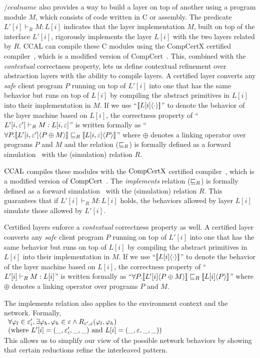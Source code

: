 {$/ccalname$ also provides a way to build a layer on top of another using a program module $M$, which consists of code written in C or assembly.
The predicate $L'[i] \vdash_R  M : L[i]$ indicates that the layer implementation $M$, built on top of the interface $L'[i]$, rigorously implements
the layer $L[i]$ with the two layers related by $R$.
CCAL can compile these C modules using the CompCertX certified compiler~\cite{deepspec},
which is a modified version of CompCert~\cite{compcert}.
This, combined with the {\em contextual} correctness property,
lets us define contextual refinement over abstraction layers with the ability to compile layers.
A certified layer converts any {\em safe} client program $P$ running on top of $L'[i]$ into one that has the
same behavior but runs on top of $L[i]$ by compiling the abstract
primitives in $L[i]$ into their implementation in $M$.
If we use ``$[\![{L[i]} \langle {\cdot} \rangle]\!]$'' to denote the behavior of the layer machine based on
$L[i]$, the correctness property of ``$L'[i, {\varepsilon}'] \vdash_{R} M : L[i, {\varepsilon}]$'' is written
formally as ``$\forall{}P.[\![{L'[i, {\varepsilon}']} \langle {P\oplus{}M} \rangle]\!] \sqsubseteq_R [\![{L[i, {\varepsilon}]} \langle {P} \rangle]\!]$''
where $\oplus$ denotes a linking operator over programs $P$ and $M$ and 
the relation ($\sqsubseteq_R$) is formally defined as a forward
simulation~\cite{Lynch95,leroy09,Milner71,Park81} with the (simulation) relation $R$.

$\mathrm{CCAL}$ compiles these modules with the $\mathrm{CompCertX}$ certified compiler~\cite{deepspec},
which is a modified version of $\mathrm{CompCert}$~\cite{deepspec, compcert}.
The {\em implements} relation ($\sqsubseteq_R$) is formally defined as a forward
simulation~\cite{Lynch95,leroy09,Milner71,Park81} with the (simulation) relation $R$.
This guarantees that if $L'[i] \vdash_R  M : L[i]$ holds,
the behaviors allowed by layer $L[i]$ simulate those allowed by $L'[i]$.

Certified layers enforce a {\em contextual} correctness property as well.
A certified layer converts any {\em safe} client program $P$ running on top of $L'[i]$ into one that has the
same behavior but runs on top of $L[i]$ by compiling the abstract
primitives in $L[i]$ into their implementation in $M$.
If we use ``$[\![{L[i]} \langle {\cdot} \rangle]\!]$'' to denote the behavior of the layer machine based on
$L[i]$, the correctness property of ``$L'[i] \vdash_{R} M : L[i]$'' is written
formally as ``$\forall{}P.[\![{L'[i]} \langle {P\oplus{}M} \rangle]\!] \sqsubseteq_R [\![{L[i]} \langle {P} \rangle]\!]$''
where $\oplus$ denotes a linking operator over programs $P$ and $M$.

The implements relation also applies to the environment context and the network.
Formally,\\
$\begin{array}{l}
\forall \varphi_l \in \oracle'_i, \exists \varphi_h,  \varphi_h \in \oracle \wedge R_{\oracle', \oracle}(\varphi_l , \varphi_h) \\
\hfill (\mbox{where} \ L'[i] = (\_,  \oracle'_i, \_, \_) \ \mbox{and} \ L[i] = (\_,  \oracle, \_, \_))
\end{array}
$\\
This allows us to simplify our view of the possible network behaviors by showing that certain reductions refine the interleaved pattern.
}